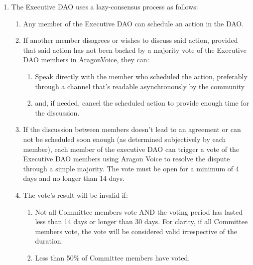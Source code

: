 \begin{enumerate}
\begin{enumerate}
\begin{enumerate}
		\end{enumerate}
	
		\begin{enumerate}
			
			\item The Executive \ac{DAO} uses a lazy-consensus process as follows:
			\begin{enumerate}
				
				\item Any member of the Executive \ac{DAO} can schedule an action in the \ac{DAO}.
				\item If another member disagrees or wishes to discuss said action, provided that said action has not been backed by a majority vote of the Executive \ac{DAO} members in \gls{AragonVoice}, they can:
				\begin{enumerate}
					\item Speak directly with the member who scheduled the action, preferably through a channel that’s readable asynchronously by the community
					\item and, if needed, cancel the scheduled action to provide enough time for the discussion.
				\end{enumerate}
				
				\item If the discussion between members doesn’t lead to an agreement or can not be scheduled soon enough (as determined subjectively by each member), each member of the executive \ac{DAO} can trigger a vote of the Executive \ac{DAO} members using Aragon Voice to resolve the dispute through a simple majority.
				The vote must be open for a minimum of 4 days and no longer than 14 days.
				\item The vote’s result will be invalid if:
				\begin{enumerate}
					\item Not all Committee members vote AND the voting period has lasted less than 14 days or longer than 30 days.
					For clarity, if all Committee members vote, the vote will be considered valid irrespective of the duration.
					\item Less than 50\% of Committee members have voted.
				\end{enumerate}
			
			\end{enumerate}
		
		\end{enumerate}
	
	\end{enumerate}
	


\end{enumerate}
